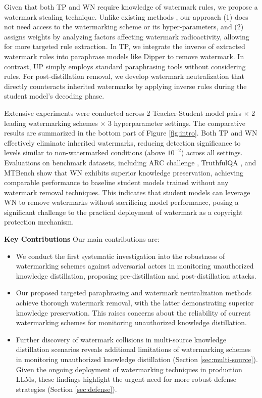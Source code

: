 Given that both TP and WN require knowledge of watermark rules, we propose a watermark stealing technique. Unlike existing methods \cite{jovanovicwatermark,wu-chandrasekaran-2024-bypassing,zhang2024large}, our approach (1) does not need access to the watermarking scheme or its hyper-parameters, and (2) assigns weights by analyzing factors affecting watermark radioactivity, allowing for more targeted rule extraction. In TP, we integrate the inverse of extracted watermark rules into paraphrase models like Dipper \cite{krishna2023paraphrasing} to remove watermark. In contrast, UP simply employs standard paraphrasing tools without considering rules. For post-distillation removal, we develop watermark neutralization that directly counteracts inherited watermarks by applying inverse rules during the student model's decoding phase.

Extensive experiments were conducted across 2 Teacher-Student model pairs $\times$ 2 leading watermarking schemes $\times$ 3 hyperparameter settings. The comparative results are summarized in the bottom part of Figure \ref{fig:intro}. Both TP and WN effectively eliminate inherited watermarks, reducing detection significance to levels similar to non-watermarked conditions (above $10^{-2}$) across all settings. Evaluations on benchmark datasets, including ARC challenge \cite{Clark2018ThinkYH}, TruthfulQA \cite{lin-etal-2022-truthfulqa}, and MTBench \cite{zheng2023judging} show that WN exhibits superior knowledge preservation, achieving comparable performance to baseline student models trained without any watermark removal techniques. This indicates that student models can leverage WN to remove watermarks without sacrificing model performance, posing a significant challenge to the practical deployment of watermark as a copyright protection mechanism.

\vspace{3pt}

\noindent \textbf{Key Contributions} \quad Our main contributions are:
\begin{itemize}
    \item We conduct the first systematic investigation into the robustness of watermarking schemes against adversarial actors in monitoring unauthorized knowledge distillation, proposing pre-distillation and post-distillation attacks.
    \item Our proposed targeted paraphrasing and watermark neutralization methods achieve thorough watermark removal, with the latter demonstrating superior knowledge preservation. This raises concerns about the reliability of current watermarking schemes for monitoring unauthorized knowledge distillation.
    \item Further discovery of watermark collisions in multi-source knowledge distillation scenarios reveals additional limitations of watermarking schemes in monitoring unauthorized knowledge distillation (Section \ref{sec:multi-source}). Given the ongoing deployment of watermarking techniques in production LLMs, these findings highlight the urgent need for more robust defense strategies (Section \ref{sec:defense}).
\end{itemize}

